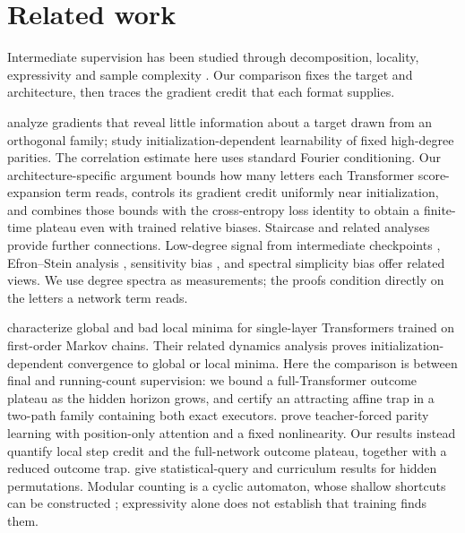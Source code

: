 \section{Related work}
\label{sec:related}

Intermediate supervision has been studied through decomposition, locality, expressivity and
sample complexity \citep{nye2021scratchpads,wies2023subtask,prystawski2023think,abbe2024globality,
feng2023towards,merrill2024expressive,malach2023autoregressive,hanneke2026samplecomplexityautoregressivereasoning,wen2024sparse}.
Our comparison fixes the target and architecture, then traces the gradient credit that each format supplies.

\citet{shalevshwartz2017failures} analyze gradients that reveal little information
about a target drawn from an orthogonal family; \citet{abbe2025parities} study
initialization-dependent learnability of fixed high-degree parities.
The correlation estimate here uses standard Fourier conditioning. Our architecture-specific
argument bounds how many letters each Transformer score-expansion term reads, controls
its gradient credit uniformly near initialization, and combines those bounds with the
cross-entropy loss identity to obtain a finite-time plateau even with trained relative biases.
Staircase and related analyses
\citep{abbe2021staircase,abbe2022mergedstaircase,abbe2023sgd} provide further connections.
Low-degree signal from intermediate checkpoints \citep{panigrahi2025progressive}, Efron--Stein
analysis \citep{li2025noise}, sensitivity bias \citep{hahn2024sensitive}, and spectral simplicity
bias \citep{yang2019spectral} offer related views. We use degree spectra as measurements;
the proofs condition directly on the letters a network term reads.

\citet{makkuva2025attention} characterize global and bad local minima for single-layer
Transformers trained on first-order Markov chains. Their related dynamics analysis
\citep{makkuva2024local} proves initialization-dependent convergence to global or local
minima. Here the comparison is between final and running-count supervision:
we bound a full-Transformer outcome plateau as the hidden horizon grows, and certify
an attracting affine trap in a two-path family containing both exact executors.
\citet{kim2024parity} prove teacher-forced parity learning with position-only attention and a fixed
nonlinearity. Our results instead quantify local step credit and the full-network
outcome plateau, together with a reduced outcome trap. \citet{wang2025compositional} give statistical-query
and curriculum results for hidden permutations. Modular counting is a cyclic automaton,
whose shallow shortcuts can be constructed \citep{liu2023automata}; expressivity alone does
not establish that training finds them.

